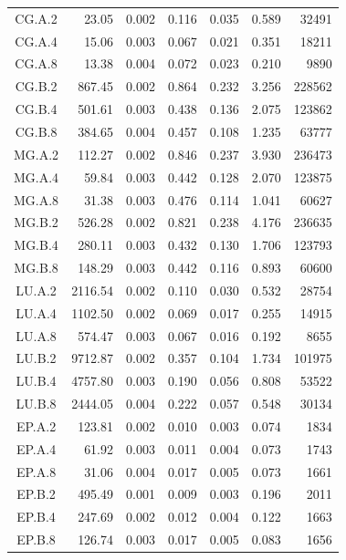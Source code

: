 \begin{longtable}[c]{c*{6}{r}}
  \endfoot%
  \endlastfoot%
    CG.A.2 & 23.05   & 0.002 & 0.116 & 0.035 & 0.589 & 32491  \\
    CG.A.4 & 15.06   & 0.003 & 0.067 & 0.021 & 0.351 & 18211  \\
    CG.A.8 & 13.38   & 0.004 & 0.072 & 0.023 & 0.210 & 9890   \\
    CG.B.2 & 867.45  & 0.002 & 0.864 & 0.232 & 3.256 & 228562 \\
    CG.B.4 & 501.61  & 0.003 & 0.438 & 0.136 & 2.075 & 123862 \\
    CG.B.8 & 384.65  & 0.004 & 0.457 & 0.108 & 1.235 & 63777  \\
    MG.A.2 & 112.27  & 0.002 & 0.846 & 0.237 & 3.930 & 236473 \\
    MG.A.4 & 59.84   & 0.003 & 0.442 & 0.128 & 2.070 & 123875 \\
    MG.A.8 & 31.38   & 0.003 & 0.476 & 0.114 & 1.041 & 60627  \\
    MG.B.2 & 526.28  & 0.002 & 0.821 & 0.238 & 4.176 & 236635 \\
    MG.B.4 & 280.11  & 0.003 & 0.432 & 0.130 & 1.706 & 123793 \\
    MG.B.8 & 148.29  & 0.003 & 0.442 & 0.116 & 0.893 & 60600  \\
    LU.A.2 & 2116.54 & 0.002 & 0.110 & 0.030 & 0.532 & 28754  \\
    LU.A.4 & 1102.50 & 0.002 & 0.069 & 0.017 & 0.255 & 14915  \\
    LU.A.8 & 574.47  & 0.003 & 0.067 & 0.016 & 0.192 & 8655   \\
    LU.B.2 & 9712.87 & 0.002 & 0.357 & 0.104 & 1.734 & 101975 \\
    LU.B.4 & 4757.80 & 0.003 & 0.190 & 0.056 & 0.808 & 53522  \\
    LU.B.8 & 2444.05 & 0.004 & 0.222 & 0.057 & 0.548 & 30134  \\
    EP.A.2 & 123.81  & 0.002 & 0.010 & 0.003 & 0.074 & 1834   \\
    EP.A.4 & 61.92   & 0.003 & 0.011 & 0.004 & 0.073 & 1743   \\
    EP.A.8 & 31.06   & 0.004 & 0.017 & 0.005 & 0.073 & 1661   \\
    EP.B.2 & 495.49  & 0.001 & 0.009 & 0.003 & 0.196 & 2011   \\
    EP.B.4 & 247.69  & 0.002 & 0.012 & 0.004 & 0.122 & 1663   \\
    EP.B.8 & 126.74  & 0.003 & 0.017 & 0.005 & 0.083 & 1656   \\
  \bottomrule[1.5pt]
\end{longtable}

